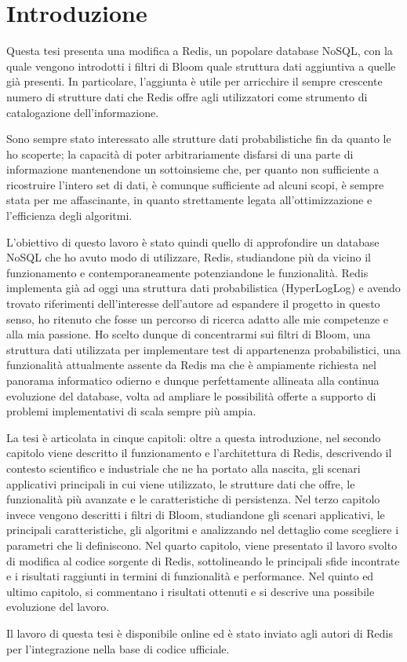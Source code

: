 \chapter{Introduzione}

Questa tesi presenta una modifica a Redis, un popolare database NoSQL, con la quale vengono
introdotti i filtri di Bloom quale struttura dati aggiuntiva a quelle già presenti. In particolare,
l'aggiunta è utile per arricchire il sempre crescente numero di strutture dati che Redis offre agli
utilizzatori come strumento di catalogazione dell'informazione.

Sono sempre stato interessato alle strutture dati probabilistiche fin da quanto le ho scoperte; la
capacità di poter arbitrariamente disfarsi di una parte di informazione mantenendone un sottoinsieme
che, per quanto non sufficiente a ricostruire l'intero set di dati, è comunque sufficiente ad alcuni
scopi, è sempre stata per me affascinante, in quanto strettamente legata all'ottimizzazione e
l'efficienza degli algoritmi.

L'obiettivo di questo lavoro è stato quindi quello di approfondire un database NoSQL che ho avuto
modo di utilizzare, Redis, studiandone più da vicino il funzionamento e contemporaneamente
potenziandone le funzionalità. Redis implementa già ad oggi una struttura dati probabilistica
(HyperLogLog) e avendo trovato riferimenti dell'interesse dell'autore ad espandere il progetto in
questo senso, ho ritenuto che fosse un percorso di ricerca adatto alle mie competenze e alla mia
passione. Ho scelto dunque di concentrarmi sui filtri di Bloom, una struttura dati utilizzata
per implementare test di appartenenza probabilistici, una funzionalità attualmente assente da
Redis ma che è ampiamente richiesta nel panorama informatico odierno e dunque perfettamente
allineata alla continua evoluzione del database, volta ad ampliare le possibilità offerte a
supporto di problemi implementativi di scala sempre più ampia.

La tesi è articolata in cinque capitoli: oltre a questa introduzione, nel secondo capitolo viene
descritto il funzionamento e l'architettura di Redis, descrivendo il contesto scientifico e
industriale che ne ha portato alla nascita, gli scenari applicativi principali in cui viene
utilizzato, le strutture dati che offre, le funzionalità più avanzate e le caratteristiche di
persistenza. Nel terzo capitolo invece vengono descritti i filtri di Bloom, studiandone gli scenari
applicativi, le principali caratteristiche, gli algoritmi e analizzando nel dettaglio come scegliere
i parametri che li definiscono. Nel quarto capitolo, viene presentato il lavoro svolto di modifica
al codice sorgente di Redis, sottolineando le principali sfide incontrate e i risultati raggiunti in
termini di funzionalità e performance. Nel quinto ed ultimo capitolo, si commentano i risultati
ottenuti e si descrive una possibile evoluzione del lavoro.

Il lavoro di questa tesi è disponibile online ed è stato inviato agli autori di Redis per
l'integrazione nella base di codice ufficiale.

